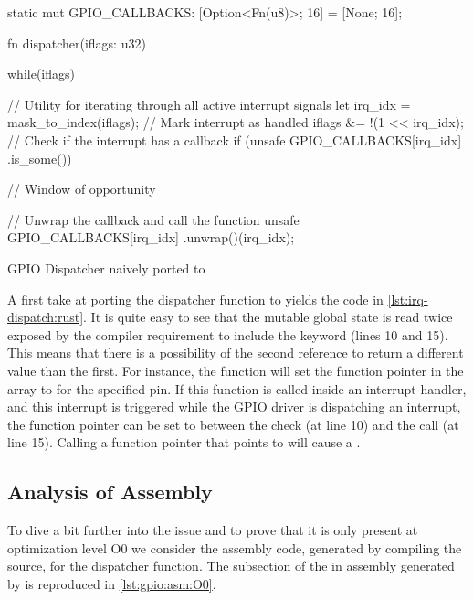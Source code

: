 \begin{listing}
  \begin{rustcode}
static mut GPIO_CALLBACKS: [Option<Fn(u8)>; 16] = [None; 16];

fn dispatcher(iflags: u32) {
  while(iflags) {
    // Utility for iterating through all active interrupt signals
    let irq_idx = mask_to_index(iflags);
    // Mark interrupt as handled
    iflags &= !(1 << irq_idx);
    // Check if the interrupt has a callback
    if (unsafe { GPIO_CALLBACKS[irq_idx] }.is_some()) {

      // Window of opportunity

      // Unwrap the callback and call the function
      unsafe { GPIO_CALLBACKS[irq_idx] }.unwrap()(irq_idx);
    }
  }
}
  \end{rustcode}
  \caption{GPIO Dispatcher naively ported to {\rust}}
  \label{lst:irq-dispatch:rust}
\end{listing}

A first take at porting the dispatcher function to {\rust} yields the code in \autoref{lst:irq-dispatch:rust}.
It is quite easy to see that the mutable global state is read twice exposed by the compiler requirement to include the {\unsafe} keyword (lines 10 and 15).
This means that there is a possibility of the second reference to return a different value than the first.
For instance, the function  will set the function pointer in the array to  for the specified pin.
If this function is called inside an interrupt handler, and this interrupt is triggered while the GPIO driver is dispatching an interrupt, the function pointer can be set to  between the check (at line 10) and the call (at line 15).
Calling a function pointer that points to  will cause a .

\subsection{Analysis of Assembly}
To dive a bit further into the issue and to prove that it is only present at optimization level O0 we consider the assembly code, generated by compiling the {\C} source, for the dispatcher function.
The subsection of the  in assembly generated by  is reproduced in \autoref{lst:gpio:asm:O0}.

